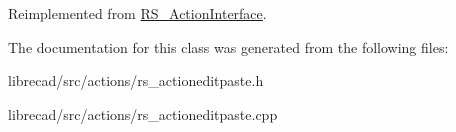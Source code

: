 Reimplemented from \hyperlink{classRS__ActionInterface_a25ec66468e5b09483afccd2358877361}{R\-S\-\_\-\-Action\-Interface}.



The documentation for this class was generated from the following files\-:\begin{DoxyCompactItemize}
\item 
librecad/src/actions/rs\-\_\-actioneditpaste.\-h\item 
librecad/src/actions/rs\-\_\-actioneditpaste.\-cpp\end{DoxyCompactItemize}
